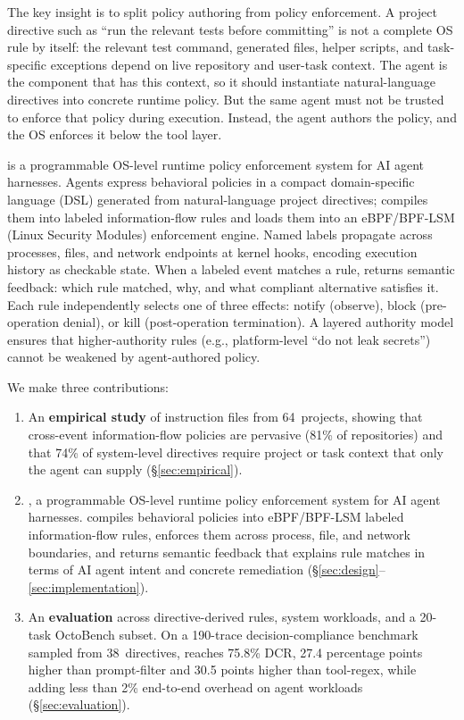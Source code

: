 The key insight is to split policy authoring from policy enforcement. A
project directive such as ``run the relevant tests before committing'' is
not a complete OS rule by itself: the relevant test command, generated
files, helper scripts, and task-specific exceptions depend on live
repository and user-task context. The agent is the component that has this
context, so it should instantiate natural-language directives into
concrete runtime policy. But the same agent must not be trusted to enforce
that policy during execution. Instead, the agent authors the policy, and
the OS enforces it below the tool layer.

\sys{} is a programmable OS-level runtime policy enforcement system for
AI agent harnesses. Agents express behavioral policies in a compact
domain-specific language (DSL) generated from natural-language project
directives; \sys{} compiles them into labeled information-flow rules and
loads them into an eBPF/BPF-LSM
(Linux Security Modules) enforcement engine. Named labels propagate across processes, files, and network
endpoints at kernel hooks, encoding execution history as checkable state.
When a labeled event matches a rule, \sys{} returns semantic
feedback: which rule matched, why, and what compliant alternative
satisfies it. Each rule independently selects one of three effects:
notify (observe), block (pre-operation denial), or kill (post-operation
termination). A layered authority model ensures that higher-authority
rules (e.g., platform-level ``do not leak secrets'') cannot be weakened by
agent-authored policy.

We make three contributions:

\begin{enumerate}
\item An \textbf{empirical study} of instruction files from 64~projects,
showing that cross-event information-flow policies are pervasive (81\% of
repositories) and that 74\% of system-level directives require project or
task context that only the agent can supply (\S\ref{sec:empirical}).

\item \textbf{\sys{}}, a programmable OS-level runtime policy enforcement
system for AI agent harnesses. \sys{} compiles behavioral policies into eBPF/BPF-LSM labeled
information-flow rules, enforces them across process, file, and network
boundaries, and returns semantic feedback that explains rule matches in
terms of AI agent intent and concrete remediation
(\S\ref{sec:design}--\ref{sec:implementation}).

\item An \textbf{evaluation} across directive-derived rules,
system workloads, and a 20-task OctoBench subset. On a 190-trace
decision-compliance benchmark sampled from 38~directives, \sys{} reaches
75.8\% DCR, 27.4 percentage points higher than prompt-filter and
30.5 points higher than tool-regex, while adding less than 2\% end-to-end overhead on
agent workloads
(\S\ref{sec:evaluation}).
\end{enumerate}
